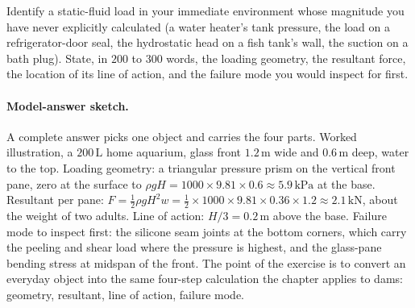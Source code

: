 \begin{exercise}
Identify a static-fluid load in your immediate environment whose
magnitude you have never explicitly calculated (a water heater's
tank pressure, the load on a refrigerator-door seal, the
hydrostatic head on a fish tank's wall, the suction on a bath
plug). State, in $200$ to $300$ words, the loading geometry, the
resultant force, the location of its line of action, and the
failure mode you would inspect for first.

\paragraph{Model-answer sketch.} A complete answer picks one object and
carries the four parts. Worked illustration, a $200\,\si{\liter}$ home
aquarium, glass front $1.2\,\si{\meter}$ wide and $0.6\,\si{\meter}$
deep, water to the top. Loading geometry: a triangular pressure prism on
the vertical front pane, zero at the surface to $\rho g H = 1000 \times
9.81 \times 0.6 \approx 5.9\,\text{kPa}$ at the base. Resultant per pane:
$F = \tfrac12\rho g H^2 w = \tfrac12 \times 1000 \times 9.81 \times 0.36
\times 1.2 \approx 2.1\,\text{kN}$, about the weight of two adults. Line
of action: $H/3 = 0.2\,\si{\meter}$ above the base. Failure mode to
inspect first: the silicone seam joints at the bottom corners, which
carry the peeling and shear load where the pressure is highest, and the
glass-pane bending stress at midspan of the front. The point of the
exercise is to convert an everyday object into the same four-step
calculation the chapter applies to dams: geometry, resultant, line of
action, failure mode.
\end{exercise}
